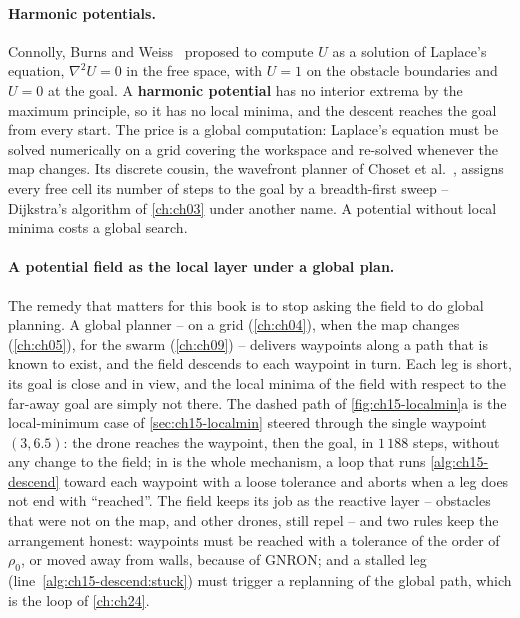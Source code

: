 \paragraph{Harmonic potentials.}
Connolly, Burns and Weiss~\cite{connolly1990laplace} proposed to compute $U$
as a solution of Laplace's equation, $\nabla^2 U = 0$ in the free space,
with $U = 1$ on the obstacle boundaries and $U = 0$ at the goal. A
\textbf{harmonic potential} has no interior
extrema by the maximum principle, so it has no local minima, and the descent
reaches the goal from every start. The price is a global computation:
Laplace's equation must be solved numerically on a grid covering the
workspace and re-solved whenever the map changes. Its discrete cousin, the wavefront planner of Choset et
al.~\cite{choset2005principles}, assigns every free cell its number of steps
to the goal by a breadth-first sweep -- Dijkstra's algorithm of \cref{ch:ch03}
under another name. A potential without local minima costs a global search.

\paragraph{A potential field as the local layer under a global plan.}
The remedy that matters for this book is to stop asking the field to do
global planning. A global planner -- \astar on a grid (\cref{ch:ch04}),
\dstarlite when the map changes (\cref{ch:ch05}), \cbs for the swarm
(\cref{ch:ch09}) -- delivers waypoints along a path that is known to exist,
and the field descends to each waypoint in turn. Each leg is short, its goal
is close and in view, and the local minima of the field with respect to the
far-away goal are simply not there. The dashed path of
\cref{fig:ch15-localmin}a is the local-minimum case of
\cref{sec:ch15-localmin} steered through the single waypoint $(3, 6.5)$: the
drone reaches the waypoint, then the goal, in $1\,188$ steps, without any
change to the field;  in
 is the whole mechanism, a loop that runs
\cref{alg:ch15-descend} toward each waypoint with a loose tolerance and
aborts when a leg does not end with ``reached''. The field keeps its job as
the reactive layer -- obstacles that were not on the map, and other drones,
still repel -- and two rules keep the arrangement honest: waypoints must be
reached with a tolerance of the order of $\rho_0$, or moved away from
walls, because of GNRON; and a stalled leg
(line~\ref{alg:ch15-descend:stuck}) must trigger a replanning of the global
path, which is the loop of \cref{ch:ch24}.

